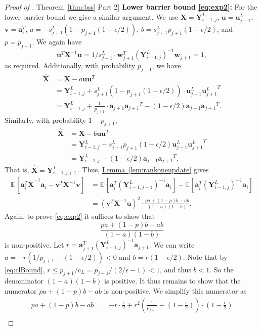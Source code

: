 \documentclass[11pt]{article}
\numberwithin{equation}{section}
\theoremstyle{definition}
\theoremstyle{plain}
\newcommand{\expref}[2]{\hyperref[#2]{#1~\ref{#2}}}
\newcommand{\bv}[1]{\mathbf{#1}}
\newcommand{\expct}[3]{\mathbb{E}_{{#1}_{#2}}\left[#3\right]}
\begin{document}
\begin{proof}[Proof of \expref{Theorem}{thm:bss} Part 2]
\noindent \textbf{Lower barrier bound \eqref{eq:exp2}:}
For the lower barrier bound we give a similar argument. We use $\bv{X} = \bv{Y}^L_{i-1,j}$, $\bv{u} = \bv{u}^L_{j+1}$, $\bv{v} = \bv{a}_i^T$, $a = -s^L_{j+1} (1 - p_{j+1} (1 - \epsilon / 2))$, $b = s^L_{j+1} p_{j+1} (1 - \epsilon / 2)$, and $p = p_{j+1}$. We again have
%
\[
  \bv{u}^T \bv{X}^{-1} \bv{u} = 1/s^L_{j+1} \cdot \bv{w}_{j+1}^T (\bv{Y}^L_{i-1,j})^{-1}  \bv{w}_{j+1} = 1,
\]
as required. Additionally, with probability 
%
$p_{j+1}$, we have   %
\begin{align*}
\bv{\widehat X} &= \bv{X} - a \bv{uu}^T\\ 
&=  \bv{Y}^L_{i-1,j} + s^L_{j+1} (1 - p_{j+1} (1 - \epsilon / 2)) \cdot \bv{u}_{j+1}^L {\bv{u}_{j+1}^L }^T\\
&=  \bv{Y}^L_{i-1,j} + \frac{1}{p_{j+1}} \cdot \bv{a}_{j+1} {\bv{a}_{j+1}}^T - (1 - \epsilon / 2) \bv{a}_{j+1} {\bv{a}_{j+1}}^T.
\end{align*}
Similarly, with probability $1-p_{j+1}$,
\begin{align*}
\bv{\widehat X} &= \bv{X} - b \bv{uu}^T\\ 
&=   \bv{Y}^L_{i-1,j}  - s^L_{j+1} p_{j+1} (1 - \epsilon / 2) \bv{u}_{j+1}^L {\bv{u}_{j+1}^L }^T\\
& = \bv{Y}^L_{i-1,j} - (1 - \epsilon / 2) \bv{a}_{j+1} {\bv{a}_{j+1}}^T.
\end{align*}
That is, $\bv{\widehat X} = \bv{Y}^L_{i-1,j+1}$\,.  Thus, \expref{Lemma}{lem:rankoneupdate} gives
\begin{align*}
\expct{}{}{\bv{a}_i^T \bv{\widehat X}^{-1} \bv{a}_i - \bv{v}^T \bv{X}^{-1} \bv{v}}  &= \expct{}{}{\bv{a}_i^T (\bv{Y}^L_{i-1,j+1})^{-1} \bv{a}_i} - \expct{}{}{\bv{a}_i^T (\bv{Y}^L_{i-1,j})^{-1}  \bv{a}_i}\\
&= (\bv{v}^T \bv{X}^{-1} \bv{u})^2 \cdot \frac{pa + (1-p)b - ab}{(1-a)(1-b)}.
\end{align*}
Again, to prove \eqref{eq:exp2} it suffices to show that
%
\[
  \frac{pa + (1-p)b - ab}{(1-a)(1-b)}
\]
is non-positive. Let
$r = \bv{a}_{j+1}^T (\bv{Y}^L_{i-1,j})^{-1} \bv{a}_{j+1}$. We can
write
$a = -r \left (1/p_{j+1} - \left (1-\epsilon/2 \right) \right ) < 0$
and $b = r \left (1-\epsilon/2\right)$. Note that by
\eqref{eq:clBound},
$r \le p_{j+1}/{c_L} = p_{j+1}/(2/\epsilon-1) < 1$, and thus $b <
1$. So the denominator $(1-a)(1-b)$ is positive. It thus remains to
show that the numerator $pa + (1-p)b - ab$ is non-positive. We
simplify this numerator as
 \begin{align*}
 pa + (1-p)b - ab &= -r \cdot \frac{\epsilon}{2} + r^2 \left (\frac{1}{p_{j+1}} - \left (1-\frac{\epsilon}{2}\right ) \right ) \cdot \left (1-\frac{\epsilon}{2}\right)\\

\end{align*}
\end{proof}
\end{document}
